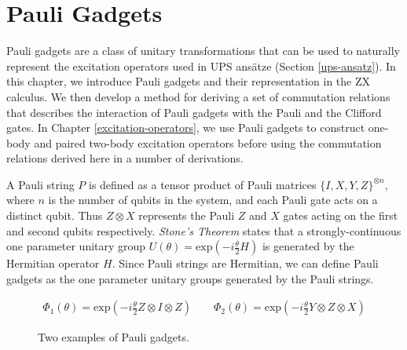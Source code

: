 \chapter{Pauli Gadgets}%
\label{pauli-gadgets}

Pauli gadgets are a class of unitary transformations that can be used to naturally represent the excitation operators used in UPS ansätze (Section \ref{ups-ansatz}). In this chapter, we introduce Pauli gadgets and their representation in the ZX calculus. We then develop a method for deriving a set of commutation relations that describes the interaction of Pauli gadgets with the Pauli and the Clifford gates. In Chapter \ref{excitation-operators}, we use Pauli gadgets to construct one-body and paired two-body excitation operators before using the commutation relations derived here in a number of derivations.

A Pauli string $P$ is defined as a tensor product of Pauli matrices $\{I, X, Y, Z\}^{\otimes n}$, where $n$ is the number of qubits in the system, and each Pauli gate acts on a distinct qubit. Thus $Z \otimes X$ represents the Pauli $Z$ and $X$ gates acting on the first and second qubits respectively. \textit{Stone's Theorem} \cite{Stone1932} states that a strongly-continuous one parameter unitary group $U(\theta) = \text{exp} \left(- i \frac{\theta}{2} H \right)$ is generated by the Hermitian operator $H$. Since Pauli strings are Hermitian, we can define Pauli gadgets as the one parameter unitary groups generated by the Pauli strings.

\begin{figure}[H]
    \centering
    \begin{gather*}
        \Phi_1(\theta) = \text{exp}\left(- i \frac{\theta}{2} Z \otimes I \otimes Z \right) \qquad
        \Phi_2(\theta) = \text{exp}\left(- i \frac{\theta}{2} Y \otimes Z \otimes X \right)%
    \end{gather*}
    \caption{Two examples of Pauli gadgets.}
\end{figure}
